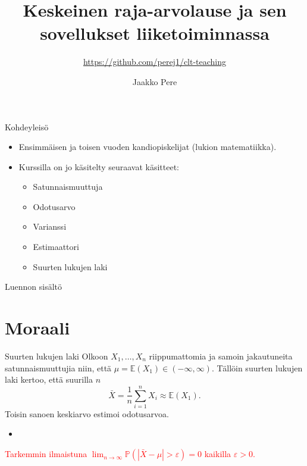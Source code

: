 \documentclass{beamer}
\title{Keskeinen raja-arvolause ja sen sovellukset liiketoiminnassa}
\subtitle{\url{https://github.com/perej1/clt-teaching}}
\author{Jaakko Pere}
\date{\displaydate{date}}
\begin{document}
\frame{\titlepage}


\begin{frame}{Kohdeyleisö}
  \begin{itemize}
    \item Ensimmäisen ja toisen vuoden kandiopiskelijat (lukion matematiikka).
    \pause
    \item Kurssilla on jo käsitelty seuraavat käsitteet:
    \begin{itemize}
      \item Satunnaismuuttuja
      \item Odotusarvo
      \item Varianssi
      \item Estimaattori
      \item Suurten lukujen laki
    \end{itemize}
  \end{itemize}
\end{frame}


\begin{frame}{Luennon sisältö}
  \tableofcontents
\end{frame}


\section{Moraali}


\begin{frame}{Suurten lukujen laki}
  Olkoon $X_1, \ldots, X_n$ riippumattomia ja samoin jakautuneita
  satunnaismuuttujia niin, että $\mu = \mathbb{E}\left(X_1\right)\in (-\infty,
  \infty)$.
  \pause
  Tällöin suurten lukujen laki kertoo, että suurilla $n$
  \begin{equation*}
    \bar X = \frac{1}{n}\sum_{i=1}^{n} X_i \approx \mathbb{E}\left(X_1\right).
  \end{equation*}
  \pause
  Toisin sanoen keskiarvo estimoi odotusarvoa.
  \begin{itemize}
    \item[]
  \end{itemize}
  \pause
  \textcolor{red}{Tarkemmin ilmaistuna
  $\lim_{n\to\infty}\mathbb{P}\left(\left|\bar X - \mu\right| >
  \varepsilon\right) = 0$ kaikilla $\varepsilon > 0$.}
\end{frame}
\end{document}
